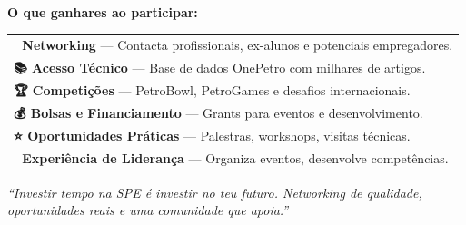\documentclass[11pt,a4paper]{article}
\begin{document}

\vspace{4.5cm}

\begin{center}

\begin{tcolorbox}[colback=white, colframe=spe-accent, arc=3mm, boxrule=2.5pt, width=17cm, inner sep=10pt]
{\Large\bfseries\color{spe-dark}O que ganhares ao participar:}

\vspace{0.5cm}

\begin{tabular}{p{}}
\color{spe-dark}\textbf{🤝 Networking} — Contacta profissionais, ex-alunos e potenciais empregadores.\\[0.4cm]
\color{spe-dark}\textbf{📚 Acesso Técnico} — Base de dados OnePetro com milhares de artigos.\\[0.4cm]
\color{spe-dark}\textbf{🏆 Competições} — PetroBowl, PetroGames e desafios internacionais.\\[0.4cm]
\color{spe-dark}\textbf{💰 Bolsas e Financiamento} — Grants para eventos e desenvolvimento.\\[0.4cm]
\color{spe-dark}\textbf{⭐ Oportunidades Práticas} — Palestras, workshops, visitas técnicas.\\[0.4cm]
\color{spe-dark}\textbf{💼 Experiência de Liderança} — Organiza eventos, desenvolve competências.\\[0.4cm]
\end{tabular}
\end{tcolorbox}

\vspace{1cm}

\begin{tcolorbox}[colback=spe-light, colframe=spe-teal, arc=3mm, boxrule=2pt, width=17cm]
{\color{spe-dark}\itshape\large ``Investir tempo na SPE é investir no teu futuro. Networking de qualidade, oportunidades reais e uma comunidade que apoia.''}
\end{tcolorbox}


\end{center}
\end{document}
